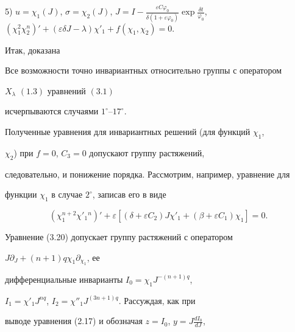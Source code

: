  


5) $u=\chi_1(J)$, $\sigma=\chi_2(J)$, $J=I-\frac{\varepsilon 


C\varphi_0}{\delta(1+\varepsilon\varphi_0)}\exp\frac{\delta 


t}{\varphi_0}$, $(\chi^2_1\chi^n_2)'+(\varepsilon\delta J-\lambda) 


\chi'_1+f(\chi_1,\chi_2)=0$. 


 


Итак, доказана 


 


\begin{thm} 


Все возможности точно инвариантных относительно группы с оператором 


$X_\lambda$ $(1.3)$ уравнений $(3.1)$ 


исчерпываются случаями $1^\circ$--$17^\circ$. 


\end{thm} 


 


Полученные уравнения для инвариантных решений (для функций $\chi_1$, 


$\chi_2$) при $f=0$, $C_3=0$ допускают группу растяжений, 


следовательно, и понижение порядка. Рассмотрим, например, уравнение для 


функции $\chi_1$ в случае $2^\circ$, записав его в виде 


\begin{equation} 


(\chi^{n+2}_1\chi'_1{}^n)'+\varepsilon 


[(\delta+\varepsilon C_2)J\chi'_1+ 


(\beta+\varepsilon C_1)\chi_1]=0. 


\tag{3.20} 


\end{equation} 


Уравнение (3.20) допускает группу растяжений с оператором 


$J\partial_J+(n+1)q\chi_1\partial_{\chi_1}$, ее 


дифференциальные инварианты $I_0=\chi_1J^{-(n+1)q}$, 


$I_1=\chi'_1J^{nq}$, $I_2=\chi''_1J^{(3n+1)q}$. Рассуждая, как при 


выводе уравнения (2.17) и обозначая $z=I_0$, $y=J\frac{dI_0}{dJ}$, 


